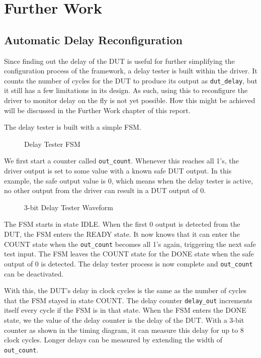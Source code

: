\chapter{Further Work}

\section{Automatic Delay Reconfiguration}

Since finding out the delay of the DUT is useful for further simplifying the configuration process of the framework, a delay tester is built within the driver.
It counts the number of cycles for the DUT to produce its output as \texttt{dut\_delay}, but it still has a few limitations in its design.
As such, using this to reconfigure the driver to monitor delay on the fly is not yet possible.
How this might be achieved will be discussed in the Further Work chapter of this report.

The delay tester is built with a simple FSM.

\begin{figure}[H]
  \centering
  
  \caption{Delay Tester FSM}
  \label{DelayTesterFSM}
\end{figure}

We first start a counter called \texttt{out\_count}.
Whenever this reaches all 1's, the driver output is set to some value with a known safe DUT output.
In this example, the safe output value is 0, which means when the delay tester is active, no other output from the driver can result in a DUT output of 0.

\begin{figure}[H]
  \centering
  
  \caption{3-bit Delay Tester Waveform}
  \label{DelayTesterWF}
\end{figure}

The FSM starts in state IDLE.
When the first 0 output is detected from the DUT, the FSM enters the READY state.
It now knows that it can enter the COUNT state when the \texttt{out\_count} becomes all 1's again, triggering the next safe test input.
The FSM leaves the COUNT state for the DONE state when the safe output of 0 is detected.
The delay tester process is now complete and \texttt{out\_count} can be deactivated.

With this, the DUT's delay in clock cycles is the same as the number of cycles that the FSM stayed in state COUNT.
The delay counter \texttt{delay\_out} increments itself every cycle if the FSM is in that state.
When the FSM enters the DONE state, we the value of the delay counter is the delay of the DUT.
With a 3-bit counter as shown in the timing diagram, it can measure this delay for up to 8 clock cycles.
Longer delays can be measured by extending the width of \texttt{out\_count}.
